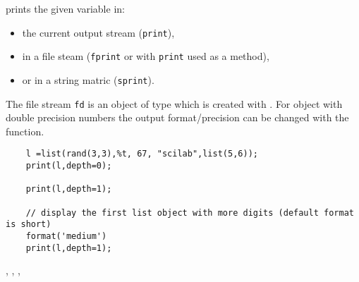 \begin{mandescription}
  prints the given variable in:
\begin{itemize}
\item the current output stream (\verb+print+), 
\item in a file steam (\verb+fprint+ or with \verb+print+ used as a method),
\item or in a string matric (\verb+sprint+).
\end{itemize}
The file stream \verb+fd+ is an object of type  which 
is created with . For object with double precision numbers
the output format/precision can be changed with the  function. 
\end{mandescription}
\begin{examples}
  \begin{Verbatim}
    l =list(rand(3,3),%t, 67, "scilab",list(5,6));
    print(l,depth=0);

    print(l,depth=1);

    // display the first list object with more digits (default format is short)
    format('medium')
    print(l,depth=1);
  \end{Verbatim}
\end{examples}
\begin{manseealso}
  , , , 
\end{manseealso}

